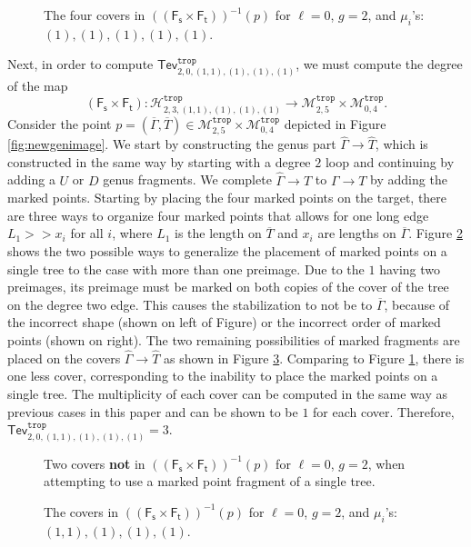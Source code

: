 \documentclass[11pt,reqno]{amsart}
\newcommand{\inputTikZ}[2]{%
     \resizebox{#1}{!}{}}
\theoremstyle{definition}
\newcommand\trop{{\mathtt{trop}}}
\newcommand\Mgn[1]{\mathcal M_{#1}}
\newcommand\Hur[1]{\mathcal H_{#1}}
\newcommand{\Ft}{\mathsf{F_t}}
\newcommand{\Fs}{\mathsf{F_s}}
\newcommand{\gGamma}{\widehat{\Gamma}}
\newcommand{\gT}{\widehat{T}}
\newcommand{\Tev}{{\mathsf{Tev}}}
\begin{document}
    \begin{figure}[tb]
        \centering
        \inputTikZ{.8\textwidth}{Figures/l=0g=2}
        \caption{The four covers in $((\Fs\times\Ft))^{-1}(p)$ for $\ell=0$, $g=2$, and $\mu_i$'s: $(1),(1),(1),(1),(1).$}
        \label{fig:l=0g=2}
    \end{figure}

Next, in order to compute $\Tev^\trop_{2,0,(1,1),(1),(1),(1)}$, we must compute the degree of the map 
\[(\Fs\times\Ft):\Hur{2,3,(1,1),(1),(1),(1)}^\trop \to \Mgn{2,5}^\trop \times \Mgn{0,4}^\trop.\]
Consider the point $p=(\overline{\Gamma},\overline{T})\in\Mgn{2,5}^\trop\times\Mgn{0,4}^\trop$ depicted in Figure \ref{fig:newgenimage}. We start by constructing the genus part $\gGamma\to\gT$, which is constructed in the same way by starting with a degree $2$ loop and continuing by adding a $U$ or $D$ genus fragments.
We complete $\gGamma\to \gT$ to $\Gamma \to T$ by adding the marked points. Starting by placing the four marked points on the target, there are three ways to organize four marked points that allows for one long edge $L_1>>x_i$ for all $i$, where $L_1$ is the length on $\overline{T}$ and $x_i$ are lengths on $\overline{\Gamma}$. Figure \ref{fig:n=4treefail} shows the two possible ways to generalize the placement of marked points on a single tree to the case with more than one preimage. Due to the $1$ having two preimages, its preimage must be marked on both copies of the cover of the tree on the degree two edge. This causes the stabilization to not be to $\overline{\Gamma}$, because of the incorrect shape (shown on left of Figure) or the incorrect order of marked points (shown on right). The two remaining possibilities of marked fragments are placed on the covers $\gGamma\to\gT$ as shown in Figure 
\ref{fig:l=0g=2(1,1)}. Comparing to Figure \ref{fig:l=0g=2}, there is one less cover, corresponding to the inability to place the marked points on a single tree. The multiplicity of each cover can be computed in the same way as previous cases in this paper and can be shown to be $1$ for each cover. Therefore, $\Tev^\trop_{2,0,(1,1),(1),(1),(1)}=3$.
\begin{figure}[tb]
    \centering
    \inputTikZ{.7\textwidth}{Figures/n=4treefail}
    \caption{Two covers \textbf{not} in $((\Fs\times\Ft))^{-1}(p)$ for $\ell=0$, $g=2$, when attempting to use a marked point fragment of a single tree.}
    \label{fig:n=4treefail}
\end{figure}


        \begin{figure}[tb]
        \centering
        \inputTikZ{.6\textwidth}{Figures/l=0g=2_1,1_}
        \caption{The covers in $((\Fs\times\Ft))^{-1}(p)$ for $\ell=0$, $g=2$, and $\mu_i$'s: $(1,1),(1),(1),(1).$}
        \label{fig:l=0g=2(1,1)}
    \end{figure}
\end{document}
